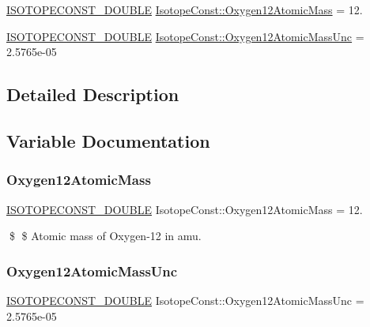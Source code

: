 \begin{DoxyCompactItemize}
\item 
\mbox{\hyperlink{group___isotope_const-_macros_ga8f45a7272ce02c0b4c65c44636ed719a}{I\+S\+O\+T\+O\+P\+E\+C\+O\+N\+S\+T\+\_\+\+D\+O\+U\+B\+LE}} \mbox{\hyperlink{group___isotope_const-_oxygen-_o12_ga3c34886e611ab57fa5b39395674d2d8c}{Isotope\+Const\+::\+Oxygen12\+Atomic\+Mass}} = 12.
\item 
\mbox{\hyperlink{group___isotope_const-_macros_ga8f45a7272ce02c0b4c65c44636ed719a}{I\+S\+O\+T\+O\+P\+E\+C\+O\+N\+S\+T\+\_\+\+D\+O\+U\+B\+LE}} \mbox{\hyperlink{group___isotope_const-_oxygen-_o12_ga6f3b29c79e9e07b883cff342e8353957}{Isotope\+Const\+::\+Oxygen12\+Atomic\+Mass\+Unc}} = 2.\+5765e-\/05
\end{DoxyCompactItemize}


\subsection{Detailed Description}


\subsection{Variable Documentation}
\mbox{\label{group___isotope_const-_oxygen-_o12_ga3c34886e611ab57fa5b39395674d2d8c}} 
\subsubsection{\texorpdfstring{Oxygen12\+Atomic\+Mass}{Oxygen12AtomicMass}}
{\footnotesize\ttfamily \mbox{\hyperlink{group___isotope_const-_macros_ga8f45a7272ce02c0b4c65c44636ed719a}{I\+S\+O\+T\+O\+P\+E\+C\+O\+N\+S\+T\+\_\+\+D\+O\+U\+B\+LE}} Isotope\+Const\+::\+Oxygen12\+Atomic\+Mass = 12.}

\$ \$ Atomic mass of Oxygen-\/12 in amu. \mbox{\label{group___isotope_const-_oxygen-_o12_ga6f3b29c79e9e07b883cff342e8353957}} 
\subsubsection{\texorpdfstring{Oxygen12\+Atomic\+Mass\+Unc}{Oxygen12AtomicMassUnc}}
{\footnotesize\ttfamily \mbox{\hyperlink{group___isotope_const-_macros_ga8f45a7272ce02c0b4c65c44636ed719a}{I\+S\+O\+T\+O\+P\+E\+C\+O\+N\+S\+T\+\_\+\+D\+O\+U\+B\+LE}} Isotope\+Const\+::\+Oxygen12\+Atomic\+Mass\+Unc = 2.\+5765e-\/05}

